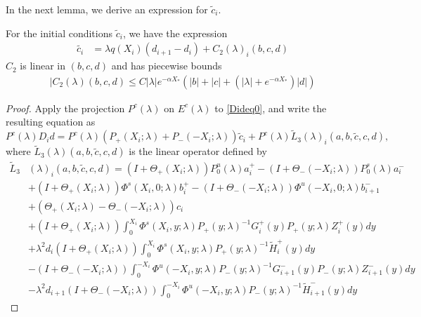 \documentclass[thesis.tex]{subfiles}
\begin{document}
In the next lemma, we derive an expression for $\tilde{c}_i$.

\begin{lemma}\label{lemma:tildec1}
For the initial conditions $\tilde{c}_i$, we have the expression
\begin{align}\label{tildeciexp1}
\tilde{c_i} &= \lambda q(X_i) (d_{i+1} - d_i ) + C_2(\lambda)_i(b, c, d)
\end{align}
$C_2$ is linear in $(b, c, d)$ and has piecewise bounds
\begin{align}\label{C2bound}
|C_2(\lambda)(b, c, d) \leq C |\lambda| e^{-\alpha X_*} \left( |b| + |c| + (|\lambda| + e^{-\alpha X_*}) |d| \right)
\end{align}

\begin{proof}
Apply the projection $P^c(\lambda)$ on $E^c(
\lambda)$ to \eqref{Dideq0}, and write the resulting equation as
\begin{equation}\label{PcDid}
P^c(\lambda)D_i d = P^c(\lambda) (P_+(X_i; \lambda) + P_-(-X_i; \lambda))\tilde{c}_i + P^c(\lambda) \tilde{L}_3(\lambda)_i(a,b,\tilde{c},c,d),
\end{equation}
where $\tilde{L}_3(\lambda)(a,b,\tilde{c},c,d)$ is the linear operator defined by
\begin{align*}
\tilde{L}_3&(\lambda)_i(a,b,\tilde{c},c,d) = (I + \Theta_+(X_i; \lambda))P_0^u(\lambda) a_i^+ - (I + \Theta_-(-X_i; \lambda))P_0^s(\lambda)a_i^- \\
&+ (I + \Theta_+(X_i; \lambda))\Phi^s(X_i, 0; \lambda) b_i^+ - (I + \Theta_-(-X_i; \lambda))\Phi^u(-X_i, 0; \lambda) b_{i+1}^- \\
&+ (\Theta_+(X_i; \lambda) - \Theta_-(-X_i; \lambda))c_i  \\
&+ (I + \Theta_+(X_i; \lambda)) \int_0^{X_i} \Phi^s(X_i, y; \lambda) P_+(y; \lambda)^{-1} G_i^+(y) P_+(y; \lambda) Z_i^+(y) dy \\
&+ \lambda^2 d_i (I + \Theta_+(X_i; \lambda))  \int_0^{X_i} \Phi^s(X_i, y; \lambda) P_+(y; \lambda)^{-1} \tilde{H}_i^+(y) dy \\ 
&- (I + \Theta_-(-X_i; \lambda)) \int_0^{-X_i} \Phi^u(-X_i, y; \lambda) P_-(y; \lambda)^{-1} G_{i+1}^-(y) P_-(y; \lambda)Z_{i+1}^-(y) dy \\
&- \lambda^2 d_{i+1} (I + \Theta_-(-X_i; \lambda)) \int_0^{-X_i} \Phi^u(-X_i, y; \lambda) P_-(y; \lambda)^{-1} \tilde{H}_{i+1}^-(y) dy
\end{align*}


\end{proof}
\end{lemma}
\end{document}
